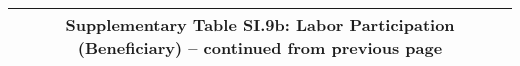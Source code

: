 \begin{longtable}{llcccccccccc}
\multicolumn{12}{c}{{\bfseries Supplementary Table SI.9b: Labor Participation (Beneficiary) -- continued from previous page}} \\ \hline                                                                                                                                                                                                                                                                                                                                                                                                                                                                                                                                                                                                                                                                                                                                                   

\end{longtable}
